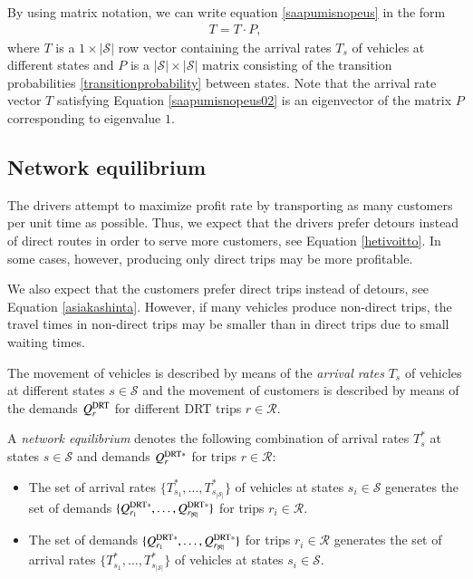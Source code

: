 \documentclass[dissertation,draft*]{aaltoseries}
\begin{document}
By using matrix notation, we can write equation \eqref{saapumisnopeus}
in the form
\begin{align}
\label{saapumisnopeus02}
T = T \cdot P, 
\end{align}
where $T$ is a $1 \times |\mathcal{S}|$ row vector containing the arrival rates $T_s$ 
of vehicles at different states and $P$ is a $|\mathcal{S}|\times |\mathcal{S}|$ matrix
consisting of the transition probabilities \eqref{transitionprobability} between states.
Note that the arrival rate vector $T$ satisfying Equation \eqref{saapumisnopeus02} 
is an eigenvector of the matrix $P$ corresponding to eigenvalue $1$.


\subsection{Network equilibrium}
\label{networkequilibrium}
The drivers attempt to maximize profit rate by 
transporting as many customers per unit time as possible. Thus, we expect that the
drivers prefer detours instead of direct routes in order to serve more 
customers, see Equation \eqref{hetivoitto}.
In some cases, however, producing only direct trips may be more profitable. 

We also expect that the customers prefer direct trips instead of detours, see Equation \eqref{asiakashinta}.
However, if many vehicles produce non-direct trips, 
the travel times in non-direct trips may be smaller than in direct trips due 
to small waiting times.

The movement of vehicles is described by means of the \emph{arrival rates} $T_s$ 
of vehicles at different states $s \in \mathcal{S}$ and
the movement of customers is described by means of the demands $Q^{\rm DRT}_r$ 
for different DRT trips $r \in \mathcal{R}$. 

A \emph{network equilibrium} denotes the following combination of
arrival rates $T_s^*$ at states $s \in \mathcal{S}$ and demands $Q_r^{{\rm DRT}*}$ for trips $r \in \mathcal{R}$: 
\begin{itemize}
\item
The set of arrival rates $\{T_{s_1}^*,\ldots,T_{s_{|\mathcal{S}|}}^*\}$ of vehicles at states $s_i \in \mathcal{S}$ 
generates the set of demands $\{Q_{r_1}^{{\rm DRT}*},\ldots,Q_{r_{|\mathcal{R}|}}^{{\rm DRT}*}\}$ for trips $r_i \in \mathcal{R}$.
\item
The set of demands $\{Q_{r_1}^{{\rm DRT}*},\ldots,Q_{r_{|\mathcal{R}|}}^{{\rm DRT}*}\}$ for trips $r_i \in \mathcal{R}$
generates the set of arrival rates $\{T_{s_1}^*,\ldots,T_{s_{|\mathcal{S}|}}^*\}$ of vehicles at states $s_i \in \mathcal{S}$. 
\end{itemize}
\end{document}
